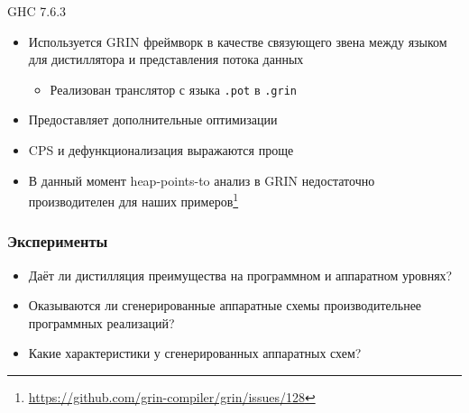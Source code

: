 \documentclass[xcolor=table,aspectratio=169]{beamer}
\begin{document}
\begin{frame}{GHC 7.6.3}
    \begin{itemize}
        \item Используется GRIN фреймворк в качестве связующего звена между языком для дистиллятора и представления потока данных
        \vfill
        \begin{itemize}
            \item Реализован транслятор с языка \texttt{.pot} в \texttt{.grin}
        \end{itemize}
        \vfill
        \item Предоставляет дополнительные оптимизации
        \vfill
        \item CPS и дефункционализация выражаются проще
        \vfill
        \item \textcolor{codepurple}{В данный момент heap-points-to анализ в GRIN недостаточно производителен для наших примеров\footnote{\url{https://github.com/grin-compiler/grin/issues/128}}}
    \end{itemize}
\end{frame}


\begin{frame}[fragile]\frametitle{Эксперименты}

\begin{itemize}
    \item Даёт ли дистилляция преимущества на программном и аппаратном уровнях?
    \vfill
    \item Оказываются ли сгенерированные аппаратные схемы производительнее программных реализаций?
    \vfill
    \item Какие характеристики у сгенерированных аппаратных схем?
\end{itemize}
    
\end{frame}



    
\end{document}
